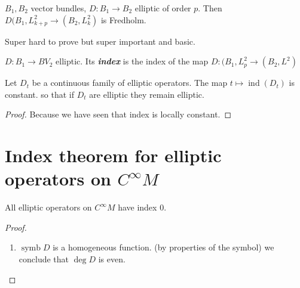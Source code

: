 \begin{thm}\leavevmode
\(B_1,B_2\) vector bundles, \(D: B_1 \to B_2\) elliptic of order $p$. Then \(D(B_1,L^2_{k+p}\to (B_2,L^2_k)\) is Fredholm.
\end{thm}

Super hard to prove but super important and basic.

\begin{defn}\leavevmode
\(D: B_1 \to BV_2\) elliptic. Its \textit{\textbf{index}} is the index of the map \(D:(B_1,L^2_p \to (B_2,L^2)\)\end{defn}

\begin{coro}\leavevmode
Let \(D_t\) be a continuous family of elliptic operators. The map \(t \mapsto \operatorname{ind}(D_t)\) is constant. so that if \(D_t\) are elliptic they remain elliptic.
\end{coro}

\begin{proof}\leavevmode
Because we have seen that index is locally constant.
\end{proof}

\section{Index theorem for elliptic operators on \(C^\infty M\)}

\begin{thm}\leavevmode
All elliptic operators on \(C^\infty M\) have index 0.
\end{thm}

\begin{proof}\leavevmode
\begin{enumerate}[label=\textbf{Step \arabic*}]
\item \(\operatorname{symb}D\) is a homogeneous function. (by properties of the symbol) we conclude that \(\operatorname{deg}D\) is even.
\end{enumerate}
\end{proof}



